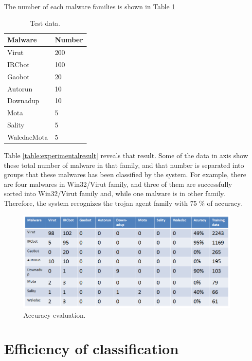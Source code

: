  The number of each malware families is shown in Table \ref{table:testdata}
 \begin{table}
  \begin{center}
    \begin{tabular}{ | l | l |}
     \hline
    Malware & Number\\ \hline
    Virut & 200\\ \hline
	IRCbot & 100\\ \hline
	Gaobot  & 20\\ \hline
	Autorun & 10\\ \hline
	Downadup &  10\\ \hline
	Mota & 5\\ \hline
	Sality  & 5  \\ \hline
	WaledacMota & 5\\ \hline
    \end{tabular}
	\end{center}
     \caption{Test data.}
      \label{table:testdata}
\end{table}
Table \ref{table:experimentalresult} reveals that result. Some of the data in axis show these total number of malware in that family, and that number is separated into groups that these malwares has been classified by the system. For example, there are four malwares in Win32/Virut family, and three of them are successfully sorted into Win32/Virut family and, while one malware is in other family. Therefore, the system recognizes the trojan agent family with 75 \% of accuracy.
\begin{figure}[h!]
\centering
\includegraphics[width=1\textwidth]
{graph/evaluation4.png}
\caption{Accuracy evaluation.}
\label{fig:evaluation}
\end{figure}
\section{Efficiency  of classification}

